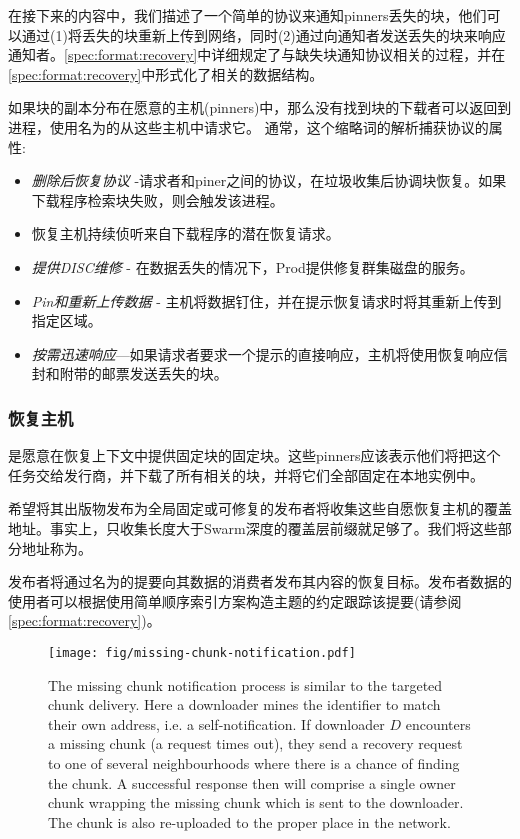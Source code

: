 在接下来的内容中，我们描述了一个简单的协议来通知pinners丢失的块，他们可以通过(1)将丢失的块重新上传到网络，同时(2)通过向通知者发送丢失的块来响应通知者。\ref{spec:format:recovery}中详细规定了与缺失块通知协议相关的过程，并在\ref{spec:format:recovery}中形式化了相关的数据结构。

如果块的副本分布在愿意的主机(pinners)中，那么没有找到块的下载者可以返回到进程，使用名为的从这些主机中请求它。
通常，这个缩略词的解析捕获协议的属性:

\begin{itemize}
\item \emph{删除后恢复协议} -请求者和piner之间的协议，在垃圾收集后协调块恢复。如果下载程序检索块失败，则会触发该进程。
\item 恢复主机持续侦听来自下载程序的潜在恢复请求。
\item \emph{提供DISC维修} - 
在数据丢失的情况下，Prod提供修复群集磁盘的服务。
\item \emph{Pin和重新上传数据} -     
主机将数据钉住，并在提示恢复请求时将其重新上传到指定区域。 
\item \emph{按需迅速响应}—如果请求者要求一个提示的直接响应，主机将使用恢复响应信封和附带的邮票发送丢失的块。
\end{itemize}

\subsubsection{恢复主机}

是愿意在恢复上下文中提供固定块的固定块。这些pinners应该表示他们将把这个任务交给发行商，并下载了所有相关的块，并将它们全部固定在本地实例中。 

希望将其出版物发布为全局固定或可修复的发布者将收集这些自愿恢复主机的覆盖地址。事实上，只收集长度大于Swarm深度的覆盖层前缀就足够了。我们将这些部分地址称为。

发布者将通过名为的提要向其数据的消费者发布其内容的恢复目标。发布者数据的使用者可以根据使用简单顺序索引方案构造主题的约定跟踪该提要(请参阅\ref{spec:format:recovery})。 

\begin{figure}[htbp]
\centering
\texttt{[image: fig/missing-chunk-notification.pdf]} \caption[Missing chunk notification process \statusgreen]{The missing chunk notification process is similar to the targeted chunk delivery. Here a downloader mines the identifier to match their own address, i.e. a self-notification. If downloader $D$ encounters a missing chunk (a request times out), they send a recovery request to one of several neighbourhoods where there is a chance of finding the chunk. A successful response then will comprise a single owner chunk wrapping the missing chunk which is sent to the downloader. The chunk is also re-uploaded to the proper place in the network.}
\label{fig:missing-chunk-notification}
\end{figure}

